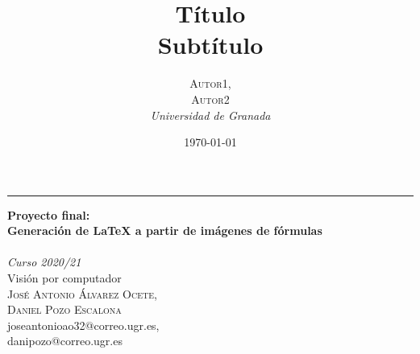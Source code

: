 \documentclass[a4paper, 20pt, dvipsnames]{article}
\title{\textbf{Título}\\ %
Subtítulo} %
\author{\textsc{Autor1,\\Autor2} %
\\{\textit{Universidad de Granada}}} %
\date{\today} %
\begin{document}

\begin{titlepage} %
	
	\raggedleft %
	
	\rule{1pt}{\textheight} %
	\hspace{0.05\textwidth} %
	\parbox[b]{0.8\textwidth}{ %
		
		{\Huge\bfseries Proyecto final:\\[0.5\baselineskip] Generación
                  de \LaTeX{} a partir de imágenes de fórmulas
                  \\[0.5\baselineskip]\\[2\baselineskip]} %
		{\large\textit{Curso 2020/21}\\[0.5\baselineskip]Visión por computador\\[1.5\baselineskip] }%
		{\Large\textsc{José Antonio Álvarez Ocete, \\Daniel Pozo Escalona}\\[1.5\baselineskip]joseantonioao32@correo.ugr.es,\\danipozo@correo.ugr.es} %
		
		\vspace{0.4\textheight} %
		
		{\noindent \\[0.5\baselineskip] }\\[\baselineskip] %
	}

\end{titlepage}


\end{document}

